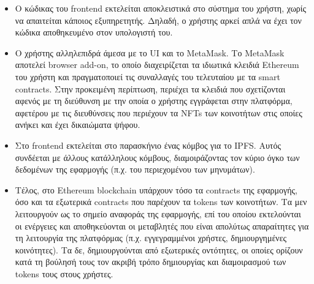 \begin{itemize}
    \item Ο κώδικας του frontend εκτελείται αποκλειστικά στο σύστημα του χρήστη, χωρίς να απαιτείται κάποιος εξυπηρετητής. Δηλαδή, ο χρήστης αρκεί απλά να έχει τον κώδικα αποθηκευμένο στον υπολογιστή του.
    \item Ο χρήστης αλληλεπιδρά άμεσα με το UI και το MetaMask. Το MetaMask αποτελεί browser add-on, το οποίο διαχειρίζεται τα ιδιωτικά κλειδιά Ethereum του χρήστη και πραγματοποιεί τις συναλλαγές του τελευταίου με τα smart contracts. Στην προκειμένη περίπτωση, περιέχει τα κλειδιά που σχετίζονται αφενός με τη διεύθυνση με την οποία ο χρήστης εγγράφεται στην πλατφόρμα, αφετέρου με τις διευθύνσεις που περιέχουν τα NFTs των κοινοτήτων στις οποίες ανήκει και έχει δικαιώματα ψήφου.
    \item Στο frontend εκτελείται στο παρασκήνιο ένας κόμβος για το IPFS. Αυτός συνδέεται με άλλους κατάλληλους κόμβους, διαμοιράζοντας τον κύριο όγκο των δεδομένων της εφαρμογής (π.χ. του περιεχομένου των μηνυμάτων).
    \item Τέλος, στο Ethereum blockchain υπάρχουν τόσο τα contracts της εφαρμογής, όσο και τα εξωτερικά contracts που παρέχουν τα tokens των κοινοτήτων. Τα μεν λειτουργούν ως το σημείο αναφοράς της εφαρμογής, επί του οποίου εκτελούνται οι ενέργειες και αποθηκεύονται οι μεταβλητές που είναι απολύτως απαραίτητες για τη λειτουργία της πλατφόρμας (π.χ. εγγεγραμμένοι χρήστες, δημιουργημένες κοινότητες). Τα δε, δημιουργούνται από εξωτερικές οντότητες, οι οποίες ορίζουν κατά τη βούλησή τους τον ακριβή τρόπο δημιουργίας και διαμοιρασμού των tokens τους στους χρήστες.
\end{itemize}